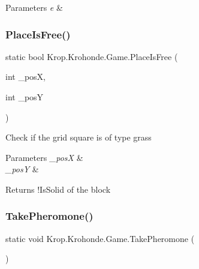 \begin{DoxyParams}{Parameters}
{\em e} & \\
\hline
\end{DoxyParams}
\mbox{\label{class_krop_1_1_krohonde_1_1_game_a1478a79991c3ede806daa5a2e6bb1f69}} 
\subsubsection{\texorpdfstring{Place\+Is\+Free()}{PlaceIsFree()}}
{\footnotesize\ttfamily static bool Krop.\+Krohonde.\+Game.\+Place\+Is\+Free (\begin{DoxyParamCaption}\item[{int}]{\+\_\+posX,  }\item[{int}]{\+\_\+posY }\end{DoxyParamCaption})\hspace{0.3cm}{\ttfamily [static]}}



Check if the grid square is of type grass 


\begin{DoxyParams}{Parameters}
{\em \+\_\+posX} & \\
\hline
{\em \+\_\+posY} & \\
\hline
\end{DoxyParams}
\begin{DoxyReturn}{Returns}
!\+Is\+Solid of the block
\end{DoxyReturn}
\mbox{\label{class_krop_1_1_krohonde_1_1_game_a17afa697841f604772d61aaf2b8719f8}} 
\subsubsection{\texorpdfstring{Take\+Pheromone()}{TakePheromone()}}
{\footnotesize\ttfamily static void Krop.\+Krohonde.\+Game.\+Take\+Pheromone (\begin{DoxyParamCaption}{ }\end{DoxyParamCaption})\hspace{0.3cm}{\ttfamily [static]}}



